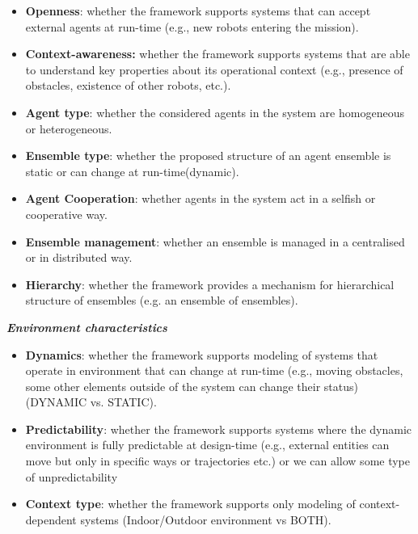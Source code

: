\documentclass[journal]{IEEEtran}
\theoremstyle{definition}
\begin{document}
\begin{itemize}
\item \textbf{Openness}: whether the framework supports systems that can accept external agents at run-time (e.g., new robots entering the mission). 
\item \textbf{Context-awareness:} whether the framework supports systems that are able to understand key properties about its operational context (e.g., presence of obstacles, existence of other robots, etc.).
	\item

\textbf{Agent type}: whether the considered agents in the system are homogeneous or heterogeneous. 

\item \textbf{Ensemble type}: whether the proposed structure of an agent ensemble is static or can change at run-time(dynamic). %
	\item \label{lbl:beha}
\textbf{Agent Cooperation}: whether agents in the system act in a selfish or cooperative way.
	\item \label{lbl:confl}
\textbf{Ensemble management}: whether an ensemble is managed in a centralised or in distributed way.
	\item \label{lbl:hierarchy}
\textbf{Hierarchy}: whether the framework provides a mechanism for hierarchical structure of ensembles (e.g. an ensemble of ensembles).
\end{itemize}

\textbf{\textit{Environment characteristics}}
\begin{itemize}
\item \textbf{Dynamics}: whether the framework supports modeling of systems that operate in environment that can change at run-time (e.g., moving obstacles, some other elements outside of the system can change their status) (DYNAMIC vs. STATIC).
\item \textbf{Predictability}: whether the framework supports systems where the dynamic environment is fully predictable at design-time (e.g., external entities can move but only in specific ways or trajectories etc.) or we can allow some type of unpredictability
\item \textbf{Context type}: whether the framework supports only modeling of context-dependent systems (Indoor/Outdoor environment vs BOTH).
\end{itemize}
\end{document}
